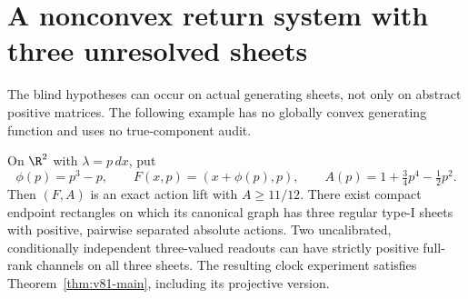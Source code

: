\section{A nonconvex return system with three unresolved sheets}
\label{sec:v81-example}

The blind hypotheses can occur on actual generating sheets, not only on
abstract positive matrices.  The following example has no globally
convex generating function and uses no true-component audit.

\begin{proposition}\label{prop:v81-shear}
On $\R^2$ with $\lambda=p\,dx$, put
\[
 \phi(p)=p^3-p,\qquad F(x,p)=(x+\phi(p),p),\qquad
 A(p)=1+\tfrac34p^4-\tfrac12p^2.
\]
Then $(F,A)$ is an exact action lift with $A\ge11/12$.  There exist
compact endpoint rectangles on which its canonical graph has three
regular type-I sheets with positive, pairwise separated absolute
actions.  Two uncalibrated, conditionally independent three-valued
readouts can have strictly positive full-rank channels on all three
sheets.  The resulting clock experiment satisfies
Theorem~\ref{thm:v81-main}, including its projective version.
\end{proposition}

